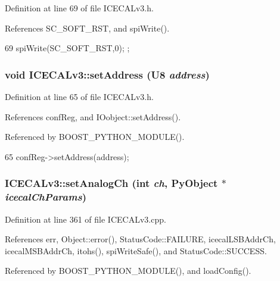 Definition at line 69 of file ICECALv3.h.

References SC\_\-SOFT\_\-RST, and spiWrite().


\begin{DoxyCode}
69 {                                       spiWrite(SC_SOFT_RST,0);                                    }
      ;
\end{DoxyCode}
\hypertarget{classICECALv3_aaf38119f47401a85022ae1b0d05675bd}{
\subsubsection[{setAddress}]{\setlength{\rightskip}{0pt plus 5cm}void ICECALv3::setAddress ({\bf U8} {\em address})}}
\label{classICECALv3_aaf38119f47401a85022ae1b0d05675bd}


Definition at line 65 of file ICECALv3.h.

References confReg, and IOobject::setAddress().

Referenced by BOOST\_\-PYTHON\_\-MODULE().


\begin{DoxyCode}
65 {   confReg->setAddress(address);   }
\end{DoxyCode}
\hypertarget{classICECALv3_a9578e4d13c250d8bc417f68c79d6a21d}{
\subsubsection[{setAnalogCh}]{ ICECALv3::setAnalogCh (int {\em ch}, \/  PyObject $\ast$ {\em icecalChParams})}}
\label{classICECALv3_a9578e4d13c250d8bc417f68c79d6a21d}


Definition at line 361 of file ICECALv3.cpp.

References err, Object::error(), StatusCode::FAILURE, icecalLSBAddrCh, icecalMSBAddrCh, itohs(), spiWriteSafe(), and StatusCode::SUCCESS.

Referenced by BOOST\_\-PYTHON\_\-MODULE(), and loadConfig().


